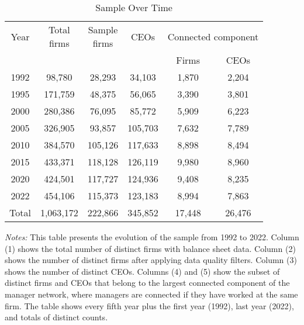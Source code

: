 \begin{table}[htbp]
\centering
\caption{Sample Over Time}
\label{tab:sample}
\begin{tabular}{*{6}{c}}
\toprule
Year & \shortstack{Total\\firms} & \shortstack{Sample\\firms} & CEOs & \multicolumn{2}{c}{Connected component} \\
\cmidrule(lr){5-6}
 & & & & Firms & CEOs \\
\midrule
1992 &       98,780 &       28,293 &       34,103 &        1,870 &        2,204 \\
1995 &      171,759 &       48,375 &       56,065 &        3,390 &        3,801 \\
2000 &      280,386 &       76,095 &       85,772 &        5,909 &        6,223 \\
2005 &      326,905 &       93,857 &      105,703 &        7,632 &        7,789 \\
2010 &      384,570 &      105,126 &      117,633 &        8,898 &        8,494 \\
2015 &      433,371 &      118,128 &      126,119 &        9,980 &        8,960 \\
2020 &      424,501 &      117,727 &      124,936 &        9,408 &        8,235 \\
2022 &      454,106 &      115,373 &      123,183 &        8,994 &        7,863 \\
\midrule
Total &    1,063,172 &      222,866 &      345,852 &       17,448 &       26,476 \\
\bottomrule
\end{tabular}
\begin{minipage}{12cm}
\footnotesize
\textit{Notes:} This table presents the evolution of the sample from 1992 to 2022. Column (1) shows the total number of distinct firms with balance sheet data. Column (2) shows the number of distinct firms after applying data quality filters. Column (3) shows the number of distinct CEOs. Columns (4) and (5) show the subset of distinct firms and CEOs that belong to the largest connected component of the manager network, where managers are connected if they have worked at the same firm. The table shows every fifth year plus the first year (1992), last year (2022), and totals of distinct counts. \end{minipage}
\end{table}

